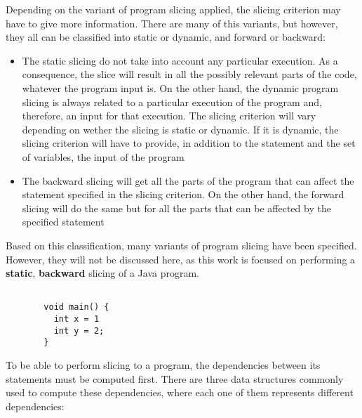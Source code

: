 \documentclass[a4paper]{article}
\begin{document}
Depending on the variant of program slicing applied, the slicing criterion may have to give more information. There are many of this variants, but however, they all can be classified into static or dynamic, and forward or backward:
\begin{itemize}

  \item The static slicing do not take into account any particular execution. As a consequence, the slice will result in all the possibly relevant parts of the code, whatever the program input is. On the other hand, the dynamic program slicing is always related to a particular execution of the program and, therefore, an input for that execution. The slicing criterion will vary depending on wether the slicing is static or dynamic. If it is dynamic, the slicing criterion will have to provide, in addition to the statement and the set of variables, the input of the program

  \item The backward slicing will get all the parts of the program that can affect the statement specified in the slicing criterion. On the other hand, the forward slicing will do the same but for all the parts that can be affected by the specified statement

\end{itemize}

Based on this classification, many variants of program slicing have been specified. However, they will not be discussed here, as this work is focused on performing a \textbf{static}, \textbf{backward} slicing of a Java program.

\begin{figure}[hbt!]
  \begin{lstlisting}[title=Example 1]
  
  void main() {
    int x = 1
    int y = 2;
  }
  \end{lstlisting}
\end{figure}

To be able to perform slicing to a program, the dependencies between its statements must be computed first. There are three data structures commonly used to compute these dependencies, where each one of them represents different dependencies:
\end{document}
